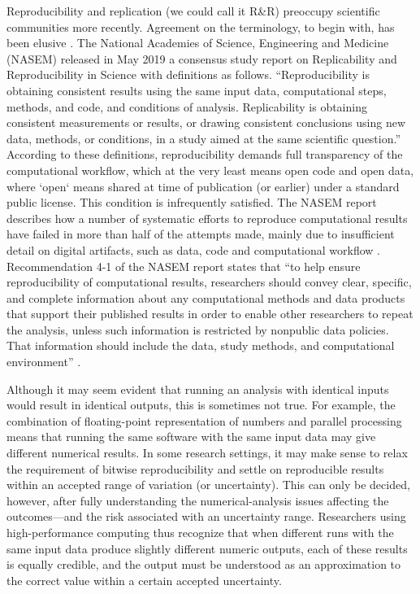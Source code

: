 Reproducibility and replication (we could call it R\&R) preoccupy scientific communities more recently. 
Agreement on the terminology, to begin with, has been elusive \cite{barba2018}. 
The National Academies of Science, Engineering and Medicine (NASEM) released in May 2019 a consensus study report on Replicability and Reproducibility in Science \cite{NASEM2019} with definitions as follows.
``Reproducibility is obtaining consistent results using the same input data, computational steps, methods, and code, and conditions of analysis.
Replicability is obtaining consistent measurements or results, or drawing consistent conclusions using new data, methods, or conditions, in a study aimed at the same scientific question.''
According to these definitions, reproducibility demands full transparency of the computational workflow, which at the very least means open code and open data, where `open` means shared at time of publication (or earlier) under a standard public license. 
This condition is infrequently satisfied.
The NASEM report describes how a number of systematic efforts to reproduce computational results have failed in more than half of the attempts made, mainly due to insufficient detail on digital artifacts, such as data, code and computational workflow \cite{moraila-etal-2014,iqbal-etal-2016,chang-li2018,stodden-etal-2018}. 
Recommendation 4-1 of the NASEM report states that 
``to help ensure reproducibility of computational results, researchers should convey clear, specific, and complete information about any computational methods and data products that support their published results in order to enable other researchers to repeat the analysis, unless such information is restricted by nonpublic data policies. That information should include the data, study methods, and computational environment'' \cite{NASEM2019}.

Although it may seem evident that running an analysis with identical inputs would result in identical outputs, this is sometimes not true. 
For example, the combination of floating-point representation of numbers and parallel processing means that running the same software with the same input data may give different numerical results. 
In some research settings, it may make sense to relax the requirement of bitwise reproducibility and settle on reproducible results within an accepted range of variation (or uncertainty). 
This can only be decided, however, after fully understanding the numerical-analysis issues affecting the outcomes---and the risk associated with an uncertainty range. 
Researchers using high-performance computing thus recognize that when different runs with the same input data produce slightly different numeric outputs, each of these results is equally credible, and the output must be understood as an approximation to the correct value within a certain accepted uncertainty.

